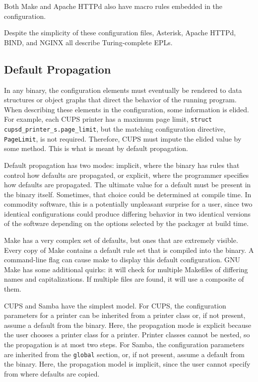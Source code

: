 \documentclass[letterpaper,twocolumn,10pt]{article}
\begin{document}
Both Make and Apache HTTPd also have macro rules embedded in the configuration.

Despite the simplicity of these configuration files, Asterisk, Apache HTTPd, BIND, and NGINX all describe Turing-complete EPLs.

\subsection{Default Propagation}
In any binary, the configuration elements must eventually be rendered to data structures or object graphs that direct the behavior of the running program. When describing these elements in the configuration, some information is elided. For example, each CUPS printer has a maximum page limit, \verb!struct cupsd_printer_s.page_limit!, but the matching configuration directive, \verb!PageLimit!, is not required. Therefore, CUPS must impute the elided value by some method. This is what is meant by default propagation.

Default propagation has two modes: implicit, where the binary has rules that control how defaults are propagated, or explicit, where the programmer specifies how defaults are propagated. The ultimate value for a default must be present in the binary itself. Sometimes, that choice could be determined at compile time. In commodity software, this is a potentially unpleasant surprise for a user, since two identical configurations could produce differing behavior in two identical versions of the software depending on the options selected by the packager at build time.

Make has a very complex set of defaults, but ones that are extremely visible. Every copy of Make contains a default rule set that is compiled into the binary. A command-line flag can cause make to display this default configuration. GNU Make has some additional quirks: it will check for multiple Makefiles of differing names and capitalizations. If multiple files are found, it will use a composite of them.\cite{make}

CUPS and Samba have the simplest model. For CUPS, the configuration parameters for a printer can be inherited from a printer class or, if not present, assume a default from the binary.\cite{cups} Here, the propagation mode is explicit because the user chooses a printer class for a printer. Printer classes cannot be nested, so the propagation is at most two steps. For Samba, the configuration parameters are inherited from the \texttt{global} section, or, if not present, assume a default from the binary.\cite{samba} Here, the propagation model is implicit, since the user cannot specify from where defaults are copied.
\end{document}
